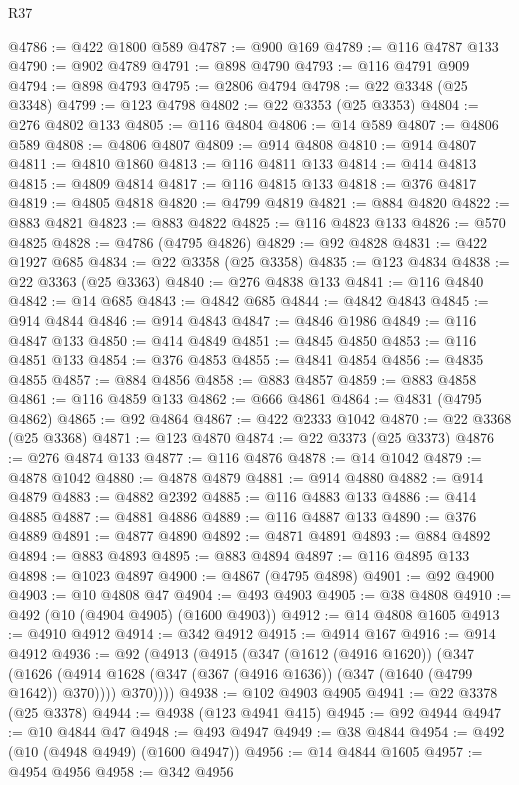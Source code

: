 \begin{lexlean}{R37}
\begin{coremodule}
@4786 := @422 @1800 @589
@4787 := @900 @169
@4789 := @116 @4787 @133
@4790 := @902 @4789
@4791 := @898 @4790
@4793 := @116 @4791 @909
@4794 := @898 @4793
@4795 := @2806 @4794
@4798 := @22 @3348 (@25 @3348)
@4799 := @123 @4798
@4802 := @22 @3353 (@25 @3353)
@4804 := @276 @4802 @133
@4805 := @116 @4804
@4806 := @14 @589
@4807 := @4806 @589
@4808 := @4806 @4807
@4809 := @914 @4808
@4810 := @914 @4807
@4811 := @4810 @1860
@4813 := @116 @4811 @133
@4814 := @414 @4813
@4815 := @4809 @4814
@4817 := @116 @4815 @133
@4818 := @376 @4817
@4819 := @4805 @4818
@4820 := @4799 @4819
@4821 := @884 @4820
@4822 := @883 @4821
@4823 := @883 @4822
@4825 := @116 @4823 @133
@4826 := @570 @4825
@4828 := @4786 (@4795 @4826)
@4829 := @92 @4828
@4831 := @422 @1927 @685
@4834 := @22 @3358 (@25 @3358)
@4835 := @123 @4834
@4838 := @22 @3363 (@25 @3363)
@4840 := @276 @4838 @133
@4841 := @116 @4840
@4842 := @14 @685
@4843 := @4842 @685
@4844 := @4842 @4843
@4845 := @914 @4844
@4846 := @914 @4843
@4847 := @4846 @1986
@4849 := @116 @4847 @133
@4850 := @414 @4849
@4851 := @4845 @4850
@4853 := @116 @4851 @133
@4854 := @376 @4853
@4855 := @4841 @4854
@4856 := @4835 @4855
@4857 := @884 @4856
@4858 := @883 @4857
@4859 := @883 @4858
@4861 := @116 @4859 @133
@4862 := @666 @4861
@4864 := @4831 (@4795 @4862)
@4865 := @92 @4864
@4867 := @422 @2333 @1042
@4870 := @22 @3368 (@25 @3368)
@4871 := @123 @4870
@4874 := @22 @3373 (@25 @3373)
@4876 := @276 @4874 @133
@4877 := @116 @4876
@4878 := @14 @1042
@4879 := @4878 @1042
@4880 := @4878 @4879
@4881 := @914 @4880
@4882 := @914 @4879
@4883 := @4882 @2392
@4885 := @116 @4883 @133
@4886 := @414 @4885
@4887 := @4881 @4886
@4889 := @116 @4887 @133
@4890 := @376 @4889
@4891 := @4877 @4890
@4892 := @4871 @4891
@4893 := @884 @4892
@4894 := @883 @4893
@4895 := @883 @4894
@4897 := @116 @4895 @133
@4898 := @1023 @4897
@4900 := @4867 (@4795 @4898)
@4901 := @92 @4900
@4903 := @10 @4808 @47
@4904 := @493 @4903
@4905 := @38 @4808
@4910 := @492 (@10 (@4904 @4905) (@1600 @4903))
@4912 := @14 @4808 @1605
@4913 := @4910 @4912
@4914 := @342 @4912
@4915 := @4914 @167
@4916 := @914 @4912
@4936 := @92
    (@4913
      (@4915
        (@347
          (@1612 (@4916 @1620))
          (@347
            (@1626 (@4914 @1628 (@347 (@367 (@4916 @1636)) (@347 (@1640 (@4799 @1642)) @370))))
            @370))))
@4938 := @102 @4903 @4905
@4941 := @22 @3378 (@25 @3378)
@4944 := @4938 (@123 @4941 @415)
@4945 := @92 @4944
@4947 := @10 @4844 @47
@4948 := @493 @4947
@4949 := @38 @4844
@4954 := @492 (@10 (@4948 @4949) (@1600 @4947))
@4956 := @14 @4844 @1605
@4957 := @4954 @4956
@4958 := @342 @4956

\end{coremodule}
\end{lexlean}
